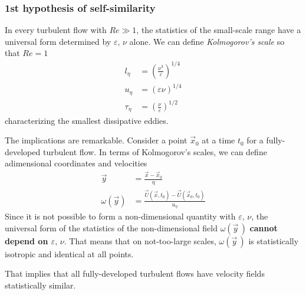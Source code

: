 \subsubsection*{1st hypothesis of self-similarity}
In every turbulent flow with $Re\gg 1$, the statistics of the small-scale range have a universal form determined by $\varepsilon,\,\nu$ alone. We can define \emph{Kolmogorov's scale} so that $Re=1$
\begin{align*}
    l_{\eta} &= \left(\frac{\nu^{3}}{\varepsilon}\right)^{1/4}\\
    u_{\eta} &= (\varepsilon\nu)^{1/4}\\
    \tau_{\eta} &= \left(\frac{\nu}{\varepsilon}\right)^{1/2}
\end{align*}
characterizing the smallest dissipative eddies.
\par The implications are remarkable. Consider a point $\vec{x}_{0}$ at a time $t_{0}$ for a fully-developed turbulent flow. In terms of Kolmogorov's scales, we can define adimensional coordinates and velocities
\begin{align*}
    \vec{y} &= \frac{\vec{x}-\vec{x}_{0}}{\eta} \\
    \omega(\vec{y}) &= \frac{\vec{U}(\vec{x},t_{0})-\vec{U}(\vec{x}_{0},t_{0})}{u_{\eta}}
\end{align*}
Since it is not possible to form a non-dimensional quantity with $\varepsilon,\,\nu$, the universal form of the statistics of the non-dimensional field $\omega(\vec{y}\,)$ \textbf{cannot depend on $\varepsilon,\,\nu$}. That means that on not-too-large scales, $\omega(\vec{y}\,)$ is statistically isotropic and identical at all points.
\par That implies that all fully-developed turbulent flows have velocity fields statistically similar.
